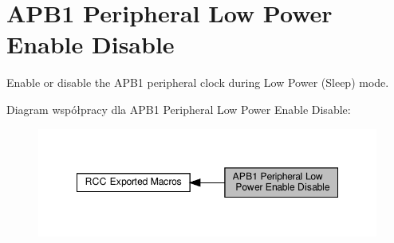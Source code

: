 \hypertarget{group___r_c_c___a_p_b1___low_power___enable___disable}{}\section{A\+P\+B1 Peripheral Low Power Enable Disable}
\label{group___r_c_c___a_p_b1___low_power___enable___disable}


Enable or disable the A\+P\+B1 peripheral clock during Low Power (Sleep) mode.  


Diagram współpracy dla A\+P\+B1 Peripheral Low Power Enable Disable\+:\nopagebreak
\begin{figure}[H]
\begin{center}
\leavevmode
\includegraphics[width=348pt]{group___r_c_c___a_p_b1___low_power___enable___disable}
\end{center}
\end{figure}
